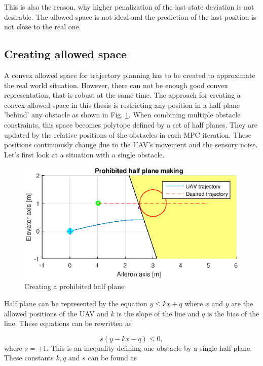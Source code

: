 \documentclass[a4paper,11pt,titlepage]{article}
\begin{document}
This is also the reason, why higher penalization of the last state deviation is not desirable. The allowed space is not ideal and the prediction of the last position is not close to the real one.

\subsection{Creating allowed space}

A convex allowed space for trajectory planning has to be created to approximate the real world situation. However, there can not be enough good convex representation, that is robust at the same time. The approach for creating a convex allowed space in this thesis is restricting any position in a half plane 'behind' any obstacle as shown in Fig. \ref{fig:half_plane}. When combining multiple obstacle constraints, this space becomes polytope defined by a set of half planes. They are updated by the relative positions of the obstacles in each MPC iteration. These positions continuously change due to the UAV's movement and the sensory noise. Let's first look at a situation with a single obstacle. 

\begin{figure}[h]
\centering
\includegraphics[width=1\textwidth]{fig/half_plain_making.eps} 
\caption{Creating a prohibited half plane}
\label{fig:half_plane}
\end{figure}

Half plane can be represented by the equation $y \leq kx + q$  where $x$ and $y$ are the allowed positions of the UAV and $k$ is the slope of the line and $q$ is the bias of the line. These equations can be rewritten as

\begin{equation}
\label{eq:simple_obstacle_cond}
s(y - kx - q) \leq 0,
\end{equation}
where $s = \pm 1$. This is an inequality defining one obstacle by a single half plane. 
These constants $k, q$ and $s$ can be found as 
\end{document}
